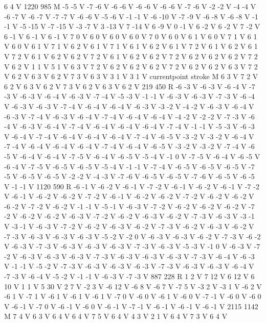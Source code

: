 {6 4 V
1220 985 M
-5 -5 V
-7 -6 V
-6 -6 V
-6 -6 V
-6 -6 V
-7 -6 V
-2 -2 V
-4 -4 V
-6 -7 V
-6 -7 V
-7 -7 V
-6 -6 V
-5 -6 V
-1 -1 V
-6 -10 V
-7 -9 V
-6 -8 V
-6 -8 V
-1 -1 V
-5 -15 V
-7 -15 V
-3 -7 V
3 -13 V
7 -14 V
6 -9 V
0 -1 V
6 -2 V
6 -2 V
7 -2 V
6 -1 V
6 -1 V
6 -1 V
7 0 V
6 0 V
6 0 V
6 0 V
7 0 V
6 0 V
6 1 V
6 0 V
7 1 V
6 1 V
6 0 V
6 1 V
7 1 V
6 2 V
6 1 V
7 1 V
6 1 V
6 2 V
6 1 V
7 2 V
6 1 V
6 2 V
6 1 V
7 2 V
6 1 V
6 2 V
6 2 V
7 2 V
6 1 V
6 2 V
6 2 V
7 2 V
6 2 V
6 2 V
6 2 V
7 2 V
6 2 V
1 1 V
5 1 V
6 3 V
7 2 V
6 2 V
6 2 V
6 2 V
7 2 V
6 2 V
6 2 V
6 3 V
7 2 V
6 2 V
6 3 V
6 2 V
7 3 V
6 3 V
3 1 V
3 1 V
currentpoint stroke M
6 3 V
7 2 V
6 2 V
6 3 V
6 2 V
7 3 V
6 2 V
6 3 V
6 2 V
219 450 R
-6 -3 V
-6 -3 V
-6 -4 V
-7 -3 V
-6 -3 V
-6 -4 V
-6 -3 V
-7 -4 V
-5 -3 V
-1 -1 V
-6 -3 V
-6 -3 V
-7 -3 V
-6 -4 V
-6 -3 V
-6 -3 V
-7 -4 V
-6 -4 V
-6 -4 V
-6 -3 V
-3 -2 V
-4 -2 V
-6 -3 V
-6 -4 V
-6 -3 V
-7 -4 V
-6 -3 V
-6 -4 V
-7 -4 V
-6 -4 V
-6 -4 V
-4 -2 V
-2 -2 V
-7 -3 V
-6 -4 V
-6 -3 V
-6 -4 V
-7 -4 V
-6 -4 V
-6 -4 V
-6 -4 V
-7 -4 V
-1 -1 V
-5 -3 V
-6 -3 V
-6 -4 V
-7 -4 V
-6 -4 V
-6 -4 V
-6 -4 V
-7 -4 V
-6 -5 V
-3 -2 V
-3 -2 V
-6 -4 V
-7 -4 V
-6 -4 V
-6 -4 V
-6 -4 V
-7 -4 V
-6 -4 V
-6 -5 V
-3 -2 V
-3 -2 V
-7 -4 V
-6 -5 V
-6 -4 V
-6 -4 V
-7 -5 V
-6 -4 V
-6 -5 V
-5 -4 V
-1 0 V
-7 -5 V
-6 -4 V
-6 -5 V
-6 -4 V
-7 -5 V
-6 -5 V
-6 -5 V
-5 -4 V
-1 -1 V
-7 -4 V
-6 -5 V
-6 -5 V
-6 -5 V
-7 -5 V
-6 -5 V
-6 -5 V
-2 -2 V
-4 -3 V
-7 -6 V
-6 -5 V
-6 -5 V
-7 -6 V
-6 -5 V
-6 -5 V
-1 -1 V
1120 590 R
-6 -1 V
-6 -2 V
-6 -1 V
-7 -2 V
-6 -1 V
-6 -2 V
-6 -1 V
-7 -2 V
-6 -1 V
-6 -2 V
-6 -2 V
-7 -2 V
-6 -1 V
-6 -2 V
-6 -2 V
-7 -2 V
-6 -2 V
-6 -2 V
-6 -2 V
-7 -2 V
-6 -2 V
-1 -1 V
-5 -1 V
-6 -3 V
-7 -2 V
-6 -2 V
-6 -2 V
-6 -2 V
-7 -2 V
-6 -2 V
-6 -2 V
-6 -3 V
-7 -2 V
-6 -2 V
-6 -3 V
-6 -2 V
-7 -3 V
-6 -3 V
-3 -1 V
-3 -1 V
-6 -3 V
-7 -2 V
-6 -2 V
-6 -3 V
-6 -2 V
-7 -3 V
-6 -2 V
-6 -3 V
-6 -2 V
-7 -3 V
-6 -3 V
-6 -3 V
-6 -3 V
-5 -2 V
-2 0 V
-6 -3 V
-6 -3 V
-6 -2 V
-7 -3 V
-6 -2 V
-6 -3 V
-7 -3 V
-6 -3 V
-6 -3 V
-6 -3 V
-7 -3 V
-6 -3 V
-5 -3 V
-1 0 V
-6 -3 V
-7 -2 V
-6 -3 V
-6 -3 V
-6 -3 V
-7 -3 V
-6 -3 V
-6 -3 V
-6 -3 V
-7 -3 V
-6 -4 V
-6 -3 V
-1 -1 V
-5 -2 V
-7 -3 V
-6 -3 V
-6 -3 V
-6 -3 V
-7 -3 V
-6 -3 V
-6 -3 V
-6 -4 V
-7 -3 V
-6 -4 V
-5 -2 V
-1 -1 V
-6 -3 V
-7 -3 V
887 228 R
1 2 V
7 12 V
6 12 V
6 10 V
1 1 V
5 30 V
2 7 V
-2 3 V
-6 12 V
-6 8 V
-6 7 V
-7 5 V
-3 2 V
-3 1 V
-6 2 V
-6 1 V
-7 1 V
-6 1 V
-6 1 V
-6 1 V
-7 0 V
-6 0 V
-6 1 V
-6 0 V
-7 -1 V
-6 0 V
-6 0 V
-6 -1 V
-7 0 V
-6 -1 V
-6 0 V
-6 -1 V
-7 -1 V
-6 -1 V
-6 -1 V
-6 -1 V
2115 1142 M
7 4 V
6 3 V
6 4 V
6 4 V
7 5 V
6 4 V
4 3 V
2 1 V
6 4 V
7 3 V
6 4 V
}
